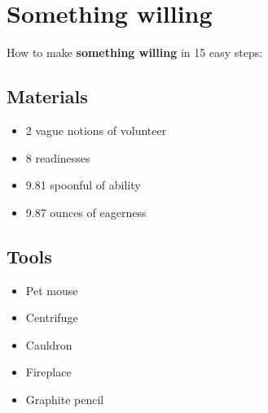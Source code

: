 \documentclass{article}
\begin{document}
\section{Something willing}How to make \textbf{something willing} in 15 easy steps:

\subsection{Materials}\begin{itemize}
\item 
2 vague notions of volunteer
\item 
8 readinesses
\item 
9.81 spoonful of ability
\item 
9.87 ounces of eagerness
\end{itemize}
\subsection{Tools}\begin{itemize}
\item 
Pet mouse
\item 
Centrifuge
\item 
Cauldron
\item 
Fireplace
\item 
Graphite pencil
\end{itemize}
\end{document}

